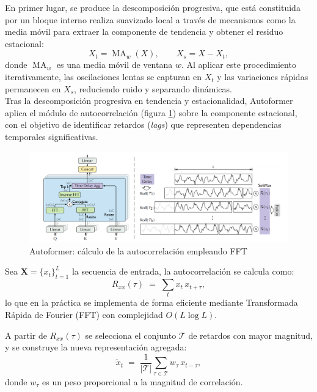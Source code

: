 En primer lugar, se produce la descomposición progresiva, que está constituida por un bloque interno realiza suavizado local a través de mecanismos como la media móvil para extraer la componente de tendencia y obtener el residuo estacional:
\[
    X_t = \operatorname{MA}_w(X), \qquad X_s = X - X_t,
\]
donde \(\operatorname{MA}_w\) es una media móvil de ventana \(w\). Al aplicar este procedimiento iterativamente, las oscilaciones lentas se capturan en \(X_t\) y las variaciones rápidas permanecen en \(X_s\), reduciendo ruido y separando dinámicas.\\

Tras la descomposición progresiva en tendencia y estacionalidad, Autoformer aplica el módulo de autocorrelación (figura \ref{autocorrelacion}) sobre la componente estacional, con el objetivo de identificar retardos (\textit{lags}) que representen dependencias temporales significativas.

\begin{figure}[!ht]
    \centering
    \includegraphics[scale=0.25]{img/autocorrelacion.png}
    \caption{Autoformer: cálculo de la autocorrelación empleando FFT~\cite{wu2022autoformerdecompositiontransformersautocorrelation}}
    \label{autocorrelacion}
\end{figure}

Sea $\mathbf{X} = \{x_t\}_{t=1}^L$ la secuencia de entrada, la autocorrelación se calcula como:
\begin{equation}
    R_{xx}(\tau) \;=\; \sum_{t} x_t \, x_{t+\tau},
\end{equation}
lo que en la práctica se implementa de forma eficiente mediante Transformada Rápida de Fourier (FFT) con complejidad $O(L \log L)$.

A partir de $R_{xx}(\tau)$ se selecciona el conjunto $\mathcal{T}$ de retardos con mayor magnitud, y se construye la nueva representación agregada:
\begin{equation}
    \tilde{x}_t \;=\; \frac{1}{|\mathcal{T}|} \sum_{\tau \in \mathcal{T}} w_\tau \, x_{t-\tau},
\end{equation}
donde $w_\tau$ es un peso proporcional a la magnitud de correlación.\\

